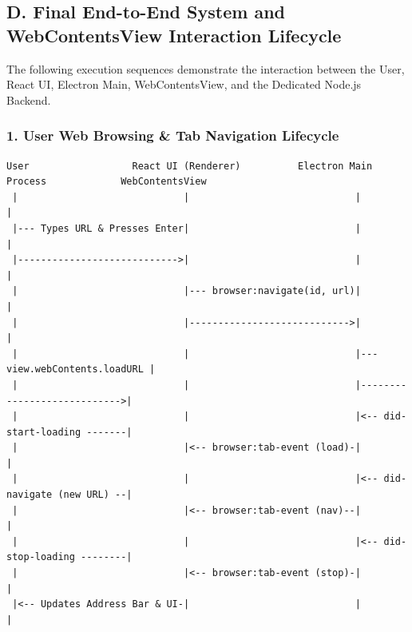 \documentclass[11pt,a4paper]{article}
\begin{document}
\subsection{D. Final End-to-End System and WebContentsView Interaction Lifecycle}

The following execution sequences demonstrate the interaction between the User, React UI, Electron Main, WebContentsView, and the Dedicated Node.js Backend.

\subsubsection{1. User Web Browsing \& Tab Navigation Lifecycle}
\begin{lstlisting}
User                  React UI (Renderer)          Electron Main Process             WebContentsView
 |                             |                             |                             |
 |--- Types URL & Presses Enter|                             |                             |
 |---------------------------->|                             |                             |
 |                             |--- browser:navigate(id, url)|                             |
 |                             |---------------------------->|                             |
 |                             |                             |--- view.webContents.loadURL |
 |                             |                             |---------------------------->|
 |                             |                             |<-- did-start-loading -------|
 |                             |<-- browser:tab-event (load)-|                             |
 |                             |                             |<-- did-navigate (new URL) --|
 |                             |<-- browser:tab-event (nav)--|                             |
 |                             |                             |<-- did-stop-loading --------|
 |                             |<-- browser:tab-event (stop)-|                             |
 |<-- Updates Address Bar & UI-|                             |                             |
\end{lstlisting}
\end{document}
